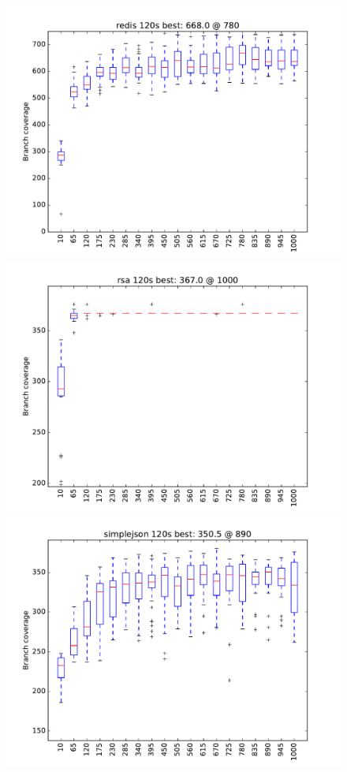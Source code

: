 \documentclass[sigplan,review]{acmart}
\begin{document}
\begin{figure}
\includegraphics[width=0.9\columnwidth]{graphs/redisrand120}
\includegraphics[width=0.9\columnwidth]{graphs/rsarand120}
\includegraphics[width=0.9\columnwidth]{graphs/simplejsonrand120}

\end{figure}
\end{document}
